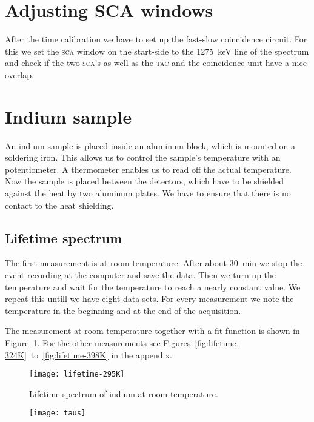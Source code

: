 \documentclass[11pt, english, fleqn, DIV=15, headinclude, BCOR=2cm]{scrreprt}
\begin{document}
\section{Adjusting SCA windows}

After the time calibration we have to set up the fast-slow coincidence
circuit. For this we set the \textsc{sca} window on the start-side
to the \SI{1275}{\kilo\electronvolt} line of the spectrum and check if the
two \textsc{sca}'s as well as the \textsc{tac} and the coincidence unit have
a nice overlap.

\section{Indium sample}

An indium sample is placed inside an aluminum block, which is mounted on a
soldering iron. This allows us to control the sample's temperature with an
potentiometer. A thermometer enables us to read off the actual temperature. Now
the sample is placed between the detectors, which have to be shielded against
the heat by two aluminum plates. We have to ensure that there is no contact to
the heat shielding. 

\subsection{Lifetime spectrum}

The first measurement is at room temperature. After about \SI{30}{\minute} we
stop the event recording at the computer and save the data. Then we turn up the
temperature and wait for the temperature to reach a nearly
constant value. We repeat this untill we have eight data sets. For every
measurement we note the temperature in the beginning and at the end of the
acquisition.

The measurement at room temperature together with a fit function is shown in
Figure~\ref{fig:lifetime-295K}. For the other measurements see
Figures~\ref{fig:lifetime-324K}~to~\ref{fig:lifetime-398K} in the appendix.

\begin{figure}
        \centering
        \texttt{[image: lifetime-295K]}
        \caption{%
                Lifetime spectrum of indium at room temperature.
        }
        \label{fig:lifetime-295K}
\end{figure}

\begin{figure}
    \centering
    \texttt{[image: taus]}
    \caption{%
    }
    \label{fig:taus}
\end{figure}
\end{document}

